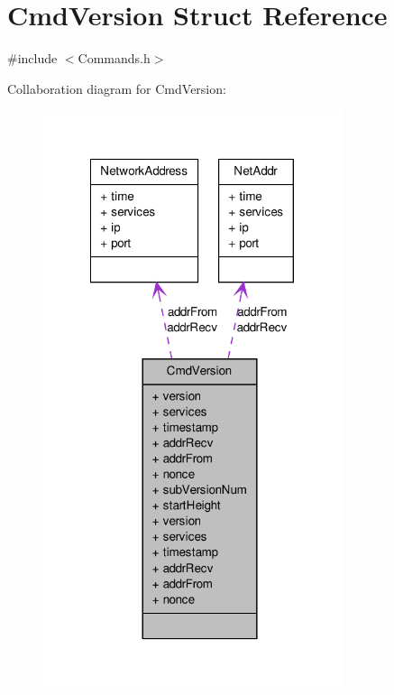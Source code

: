 \hypertarget{struct_cmd_version}{
\section{CmdVersion Struct Reference}
\label{struct_cmd_version}
}


{\ttfamily \#include $<$Commands.h$>$}



Collaboration diagram for CmdVersion:\nopagebreak
\begin{figure}[H]
\begin{center}
\leavevmode
\includegraphics[width=248pt]{struct_cmd_version__coll__graph}
\end{center}
\end{figure}
